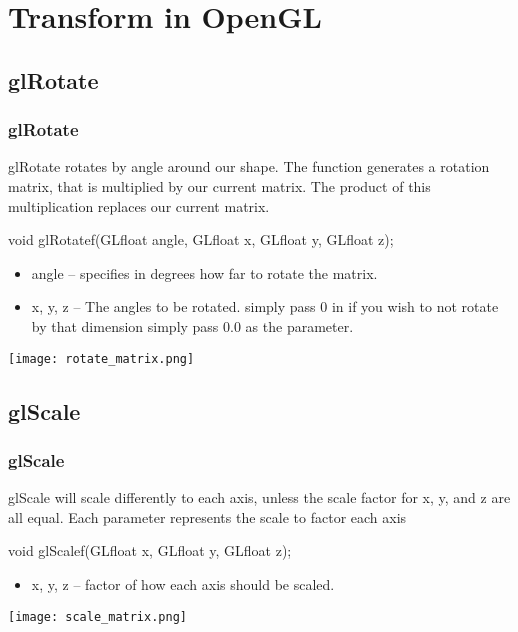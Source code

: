 \documentclass{beamer}
\begin{document}
          \section{Transform in OpenGL}


          \subsection{glRotate}
          \begin{frame}
            \frametitle{glRotate}
            glRotate rotates by angle around our shape. The function generates a rotation matrix, that is multiplied by our current matrix. The product of this multiplication replaces our current matrix.
            \begin{block}{void glRotatef(GLfloat angle,  GLfloat x,  GLfloat y,  GLfloat z);}
              \begin{itemize}
              \item angle -- specifies in degrees how far to rotate the matrix.
              \item x, y, z -- The angles to be rotated. simply pass 0 in if you wish to not rotate by that dimension simply pass 0.0 as the parameter.
              \end{itemize}
            \end{block}
            \texttt{[image: rotate\_matrix.png]}
          \end{frame}




          \subsection{glScale}
          \begin{frame}
            \frametitle{glScale}
            glScale will scale differently to each axis, unless the scale factor for x, y, and z are all equal. Each parameter represents the scale to factor each axis
            \begin{block}{void glScalef(GLfloat x, GLfloat y, GLfloat z);}
              \begin{itemize}
              \item x, y, z -- factor of how each axis should be scaled.
              \end{itemize}
            \end{block}
            \texttt{[image: scale\_matrix.png]}
          \end{frame}
\end{document}
